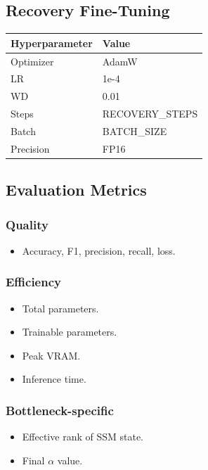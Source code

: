 \subsection{Recovery Fine-Tuning}

\begin{table}[H]
\centering
\small
\begin{tabular}{ll}
\toprule
\textbf{Hyperparameter} & \textbf{Value} \\
\midrule
Optimizer & AdamW \\
LR & 1e-4 \\
WD & 0.01 \\
Steps & {{RECOVERY\_STEPS}} \\
Batch & {{BATCH\_SIZE}} \\
Precision & FP16 \\
\bottomrule
\end{tabular}
\end{table}

\subsection{Evaluation Metrics}

\subsubsection{Quality}
\begin{itemize}
\item Accuracy, F1, precision, recall, loss.

\end{itemize}
\subsubsection{Efficiency}
\begin{itemize}
\item Total parameters.
\item Trainable parameters.
\item Peak VRAM.
\item Inference time.

\end{itemize}
\subsubsection{Bottleneck-specific}
\begin{itemize}
\item Effective rank of SSM state.
\item Final $\alpha$ value.

\end{itemize}
